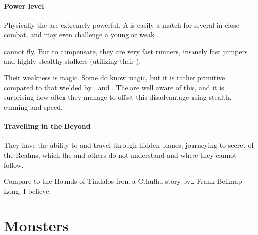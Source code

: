 \subsubsection{Power level}
Physically the \vorcanths{} are extremely powerful. 
A \vorcanth{} is easily a match for several \resphain{} in close combat, and may even challenge a young or weak \dragon{}. 

\Vorcanths{} cannot fly. 
But to compensate, they are very fast runners, insanely fast jumpers and highly stealthy stalkers (utilizing their ). 

Their weakness is magic. 
Some \vorcanths{} do know magic, but it is rather primitive compared to that wielded by \dragons{}, \resphain{} and \quiljaaran{}. 
The \vorcanths{} are well aware of this, and it is surprising how often they manage to offset this disadvantage using stealth, cunning and speed. 





\subsubsection{Travelling in the Beyond}
They have the ability to  and travel through hidden planes, journeying to secret  of the Realms, which the \dragons{} and others do not understand and where they cannot follow. 

Compare to the Hounds of Tindalos from a Cthulhu story by\ldots{} Frank Belknap Long, I believe. 























\chapter{Monsters}















